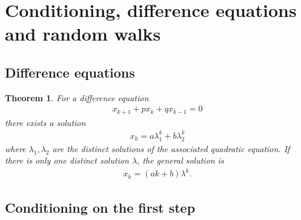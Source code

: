 \documentclass{article}
\theoremstyle{sltheorem}
\newtheorem{theorem}{Theorem}[section]
\begin{document}
\section{Conditioning, difference equations and random walks}
\subsection{Difference equations}
\begin{theorem}
    For a difference equation
    \begin{align*}
        x_{k+1}+px_k+qx_{k-1}=0
    \end{align*}
    there exists a solution
    \begin{align*}
        x_k = a\lambda_1^k+b\lambda_2^k
    \end{align*}
    where $\lambda_1,\lambda_2$ are the distinct solutions of the associated quadratic equation.
    If there is only one distinct solution $\lambda$, the general solution is
    \begin{align*}
        x_k = (ak + b)\lambda^k.
    \end{align*}
\end{theorem}
\subsection{Conditioning on the first step}
\end{document}
